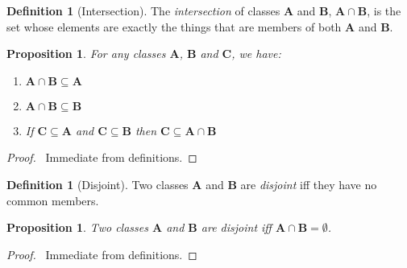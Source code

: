\documentclass{article}
\let\qed\relax
\newtheorem{proposition}[axiom]{Proposition}
\theoremstyle{definition}
\newtheorem{definition}[axiom]{Definition}
\begin{document}
    \begin{definition}[Intersection]
        The \emph{intersection} of classes $\mathbf{A}$ and $\mathbf{B}$, 
        $\mathbf{A} \cap \mathbf{B}$, is the set whose elements are exactly the
        things that are members of both $\mathbf{A}$ and $\mathbf{B}$.
    \end{definition}

    \begin{proposition}
        For any classes $\mathbf{A}$, $\mathbf{B}$ and $\mathbf{C}$, we have:
        \begin{enumerate}
            \item $\mathbf{A} \cap \mathbf{B} \subseteq \mathbf{A}$
            \item $\mathbf{A} \cap \mathbf{B} \subseteq \mathbf{B}$
            \item If $\mathbf{C} \subseteq \mathbf{A}$ and $\mathbf{C} \subseteq \mathbf{B}$
            then $\mathbf{C} \subseteq \mathbf{A} \cap \mathbf{B}$
        \end{enumerate}
    \end{proposition}

    \begin{proof}
        \pf\ Immediate from definitions. \qed
    \end{proof}

    \begin{definition}[Disjoint]
        Two classes $\mathbf{A}$ and $\mathbf{B}$ are \emph{disjoint} iff they have no common members.
    \end{definition}

    \begin{proposition}
        Two classes $\mathbf{A}$ and $\mathbf{B}$ are \emph{disjoint} iff $\mathbf{A} \cap \mathbf{B}
        = \emptyset$.
    \end{proposition}

    \begin{proof}
        \pf\ Immediate from definitions. \qed
    \end{proof}
\end{document}

